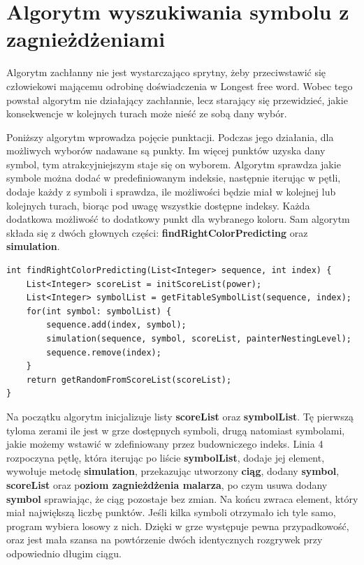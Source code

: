 \documentclass[document]{xmgr}
\begin{document}
\section{Algorytm wyszukiwania symbolu z zagnieżdżeniami}
Algorytm zachłanny nie jest wystarczająco sprytny, żeby przeciwstawić się człowiekowi mającemu odrobinę doświadczenia w Longest free word. Wobec tego powstał algorytm nie działający zachłannie, lecz starający się przewidzieć, jakie konsekwencje w kolejnych turach może nieść ze sobą dany wybór.

Poniższy algorytm wprowadza pojęcie punktacji. Podczas jego działania, dla możliwych wyborów nadawane są punkty. Im więcej punktów uzyska dany symbol, tym atrakcyjniejszym staje się on wyborem. Algorytm sprawdza jakie symbole można dodać w predefiniowanym indeksie, następnie iterując w pętli, dodaje każdy z symboli i sprawdza, ile możliwości będzie miał w kolejnej lub kolejnych turach, biorąc pod uwagę wszystkie dostępne indeksy. Każda dodatkowa możliwość to dodatkowy punkt dla wybranego koloru. Sam algorytm składa się z dwóch głownych części: \textbf{findRightColorPredicting} oraz \textbf{simulation}.

\begin{lstlisting}[frame=single]
int findRightColorPredicting(List<Integer> sequence, int index) {
	List<Integer> scoreList = initScoreList(power);
	List<Integer> symbolList = getFitableSymbolList(sequence, index);
	for(int symbol: symbolList) {
		sequence.add(index, symbol);
		simulation(sequence, symbol, scoreList, painterNestingLevel);
		sequence.remove(index);
	}
	return getRandomFromScoreList(scoreList);
}
\end{lstlisting}

Na początku algorytm inicjalizuje listy \textbf{scoreList} oraz \textbf{symbolList}. Tę pierwszą tyloma zerami ile jest w grze dostępnych symboli, drugą natomiast symbolami, jakie możemy wstawić w zdefiniowany przez budowniczego indeks. Linia 4 rozpoczyna pętlę, która iterując po liście \textbf{symbolList}, dodaje jej element, wywołuje metodę \textbf{simulation}, przekazując utworzony \textbf{ciąg}, dodany \textbf{symbol}, \textbf{scoreList} oraz p\textbf{oziom zagnieżdżenia malarza}, po czym usuwa dodany \textbf{symbol} sprawiając, że ciąg pozostaje bez zmian. Na końcu zwraca element, który miał największą liczbę punktów. Jeśli kilka symboli otrzymało ich tyle samo, program wybiera losowy z nich. Dzięki w grze występuje pewna przypadkowość, oraz jest mała szansa na powtórzenie dwóch identycznych rozgrywek przy odpowiednio długim ciągu.
\end{document}
